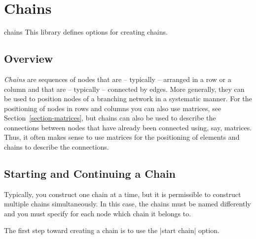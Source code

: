%
%
%


\section{Chains}
\label{section-chains}

\begin{tikzlibrary}{chains}
    This library defines options for creating chains.
\end{tikzlibrary}


\subsection{Overview}

\emph{Chains} are sequences of nodes that are -- typically -- arranged in a row
or a column and that are -- typically -- connected by edges. More generally,
they can be used to position nodes of a branching network in a systematic
manner. For the positioning of nodes in rows and columns you can also use
matrices, see Section~\ref{section-matrices}, but chains can also be used to
describe the connections between nodes that have already been connected using,
say, matrices. Thus, it often makes sense to use matrices for the positioning
of elements and chains to describe the connections.


\subsection{Starting and Continuing a Chain}

Typically, you construct one chain at a time, but it is permissible to
construct multiple chains simultaneously. In this case, the chains must be
named differently and you must specify for each node which chain it belongs to.

The first step toward creating a chain is to use the |start chain| option.

